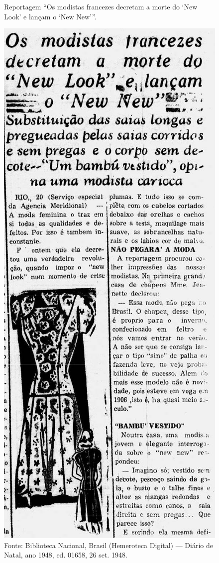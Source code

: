\begin{refsection}
    \begin{figure}%
        \begin{minipage}[b]{\marginparwidth}
            \caption{Reportagem ``Os modistas francezes de\-cre\-tam a morte do `New Look' e lançam o `New New'{}''.}
            \caption*{Fonte: Biblioteca Nacional, Brasil (Hemeroteca Digital) --- Diário de Natal, ano 1948, ed. 01658, 26 set. 1948.}
            \label{fig:morte-new-look}
        \end{minipage}
        \hspace{\marginparsep}
        \includegraphics[height=25\baselineskip]{articles/06-vencido-o-new-look-r/02-morte-new-look.jpg}
    \end{figure}%


\end{refsection}
